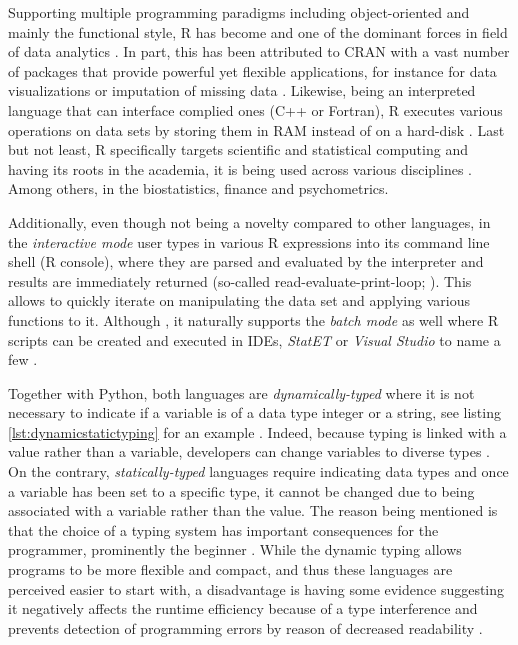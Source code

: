 Supporting multiple programming paradigms including object-oriented and mainly the functional style, R has become  and one of the dominant forces in field of data analytics \parencite[7]{Everitt:2006:HSA:1213890}.
In part, this has been attributed to \ac{CRAN} with a vast number of packages that provide powerful yet flexible applications, for instance for data visualizations or imputation of missing data \parencite{Plakidas2017EvolutionQualities}.
Likewise, being an interpreted language that can interface complied ones (C++ or Fortran), R executes various operations on data sets by storing them in \ac{RAM} instead of on a hard-disk \parencites{Kane2013ScalableData}{Hornik2016FrequentlyR}{DavidSmith2013AR}.
Last but not least, R specifically targets scientific and statistical computing and having its roots in the academia, it is being used across various disciplines \parencites{GarrettGrolemund2017RData}{TeachingDS2016}. 
Among others, in the biostatistics, finance and psychometrics.

Additionally, even though not being a novelty compared to other languages, in the \emph{interactive mode} user types in various R expressions into its command line shell (R console), where they are parsed and evaluated by the interpreter and results are immediately returned (so-called read-evaluate-print-loop; \cite{SmithDavid2009159}).
This allows to quickly iterate on manipulating the data set and applying various functions to it.
Although , it naturally supports the \emph{batch mode} as well where R scripts can be created and executed in \acp{IDE}, \emph{StatET} or \emph{Visual Studio} to name a few \parencite[29]{Pabinger2014}. 

Together with Python, both languages are \emph{dynamically-typed} where it is not necessary to indicate if a variable is of a data type integer or a string, see listing \ref{lst:dynamicstatictyping} for an example \parencites{PythonCoreTeam2012}{Lutz2013}.
Indeed, because typing is linked with a value rather than a variable, developers can change variables to diverse types \parencite{NinaBookR2014}.
On the contrary, \emph{statically-typed} languages require indicating data types and once a variable has been set to a specific type, it cannot be changed due to being associated with a variable rather than the value.
The reason being mentioned is that the choice of a typing system has important consequences for the programmer, prominently the beginner \parencite{JakeVanderPlas2016PythonHandbook}.
While the dynamic typing allows programs to be more flexible and compact, and thus these languages are perceived easier to start with, a disadvantage is having some evidence suggesting it negatively affects the runtime efficiency because of a type interference and prevents detection of programming errors by reason of decreased readability \parencites{Ousterhout1998}{FieldCadyDSBook}.


